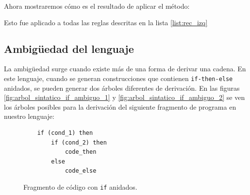 Ahora mostraremos cómo es el resultado de aplicar el método:

\begin{center}
\end{center}

Esto fue aplicado a todas las reglas descritas en la lista \ref{list:rec_izq}

\subsection{Ambigüedad del lenguaje}
\label{sec:ambiguedad_lenguaje}
La ambigüedad surge cuando existe más de una forma de derivar una cadena. En este lenguaje, cuando se generan construcciones que contienen \texttt{if-then-else} anidados, se pueden generar dos árboles diferentes de derivación. En las figuras \ref{fig:arbol_sintatico_if_ambiguo_1} y \ref{fig:arbol_sintatico_if_ambiguo_2} se ven los árboles posibles para la derivación del siguiente fragmento de programa en nuestro lenguaje:
\begin{figure}[H]
\begin{verbatim}
	if (cond_1) then
		if (cond_2) then
			code_then
		else
			code_else
\end{verbatim}
\caption{Fragmento de código con \texttt{if} anidados.}
\label{fig:if_ambiguo}
\end{figure}

